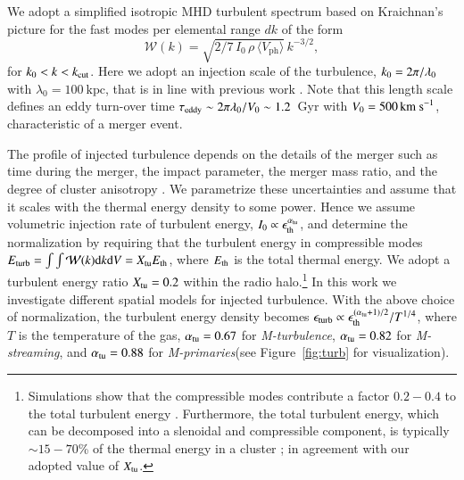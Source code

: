 \documentclass[fleqn,usenatbib,useAMS]{mnras}
\newcommand{\Mstream}{{\it M-streaming}\xspace}
\newcommand{\Mflatturb}{{\it M-turbulence}\xspace}
\newcommand{\Mprimary}{{\it M-primaries}\xspace}
\newcommand{\Vph}{V_\mathrm{ph}}
\begin{document}
We adopt a simplified isotropic MHD turbulent spectrum based on
Kraichnan's picture for the fast modes per elemental range $dk$ of the
form
\begin{equation}
  \label{eq:Wk}
  \mathcal{W}(k) =
\sqrt{2/7\,I_0\,\rho\,\langle \Vph \rangle}\,k^{-3/2},
\end{equation}
for $k_0<k<k_{\mathrm{cut}}$. Here we adopt an injection scale of the
turbulence, $k_0= 2\pi/\lambda_0$ with $\lambda_0 =100~\mbox{kpc}$,
that is in line with previous work \citep{brunetti07,brunetti11}. Note
that this length scale defines an eddy turn-over time
$\tau_{{\mathrm{eddy}}}\sim2\pi\lambda_0/V_0\sim1.2$~Gyr with
$V_0=500\,{\mathrm{km~s}}^{-1}$, characteristic of a merger event. 

The profile of injected turbulence depends on the details of the
merger such as time during the merger, the impact parameter, the
merger mass ratio, and the degree of cluster anisotropy
\citep{2015ApJ...800...60M}. We parametrize these uncertainties and
assume that it scales with the thermal energy density to some
power. Hence we assume volumetric injection rate of turbulent energy,
$I_0\propto \epsilon_{\mathrm{th}}^{\alpha_{\mathrm{tu}}}$, and determine the
normalization by requiring that the turbulent energy in compressible
modes $E_{\mathrm{turb}}=\int \int \mathcal{W}(k) {\mathrm{d}}k {\mathrm{d}}V =
X_{\mathrm{tu}} E_{\mathrm{th}}$, where $E_{\mathrm{th}}$ is the total thermal
energy. We adopt a turbulent energy ratio $X_{\mathrm{tu}}=0.2$ within the
radio halo.\footnote{Simulations show that the compressible modes
  contribute a factor $0.2-0.4$ to the total turbulent energy
  \citep{2013ApJ...771..131B,2015ApJ...800...60M}. Furthermore, the
  total turbulent energy, which can be decomposed into a slenoidal and
  compressible component, is typically $\sim15-70$\% of the thermal
  energy in a cluster \citep{2011A&A...529A..17V}; in agreement with
  our adopted value of $X_{\mathrm{tu}}$.} In this work we investigate
different spatial models for injected turbulence. With the above
choice of normalization, the turbulent energy density becomes
$\epsilon_{\mathrm{turb}} \propto
\epsilon_{\mathrm{th}}^{(\alpha_{\mathrm{tu}}+1)/2}/T^{1/4}$, where $T$ is the
temperature of the gas, $\alpha_{\mathrm{tu}}= 0.67$ for \Mflatturb,
$\alpha_{\mathrm{tu}}= 0.82$ for \Mstream, and $\alpha_{\mathrm{tu}}= 0.88$ for
\Mprimary (see Figure~\ref{fig:turb} for visualization).
\end{document}
